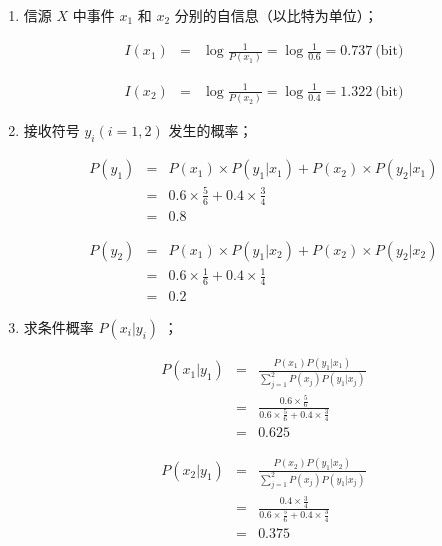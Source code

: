 \documentclass[onecolumn,oneside]{BUPTHomework}
\begin{document}
  \begin{solution}
  {
    \begin{enumerate}
      \item 信源 $X$ 中事件 $x_1$ 和 $x_2$ 分别的自信息（以比特为单位）；
      
      \begin{eqnarray} 
        I(x_1) &=& \log \frac{1}{P(x_1)} = \log \frac{1}{0.6} = 0.737\ \mbox{(bit)} \nonumber
      \end{eqnarray}
      
      \begin{eqnarray} 
        I(x_2) &=& \log \frac{1}{P(x_2)} = \log \frac{1}{0.4} = 1.322\ \mbox{(bit)} \nonumber
      \end{eqnarray}

      \item 接收符号 $y_i(i=1,2)$ 发生的概率；
      
      \begin{eqnarray} 
        P(y_1) &=& P(x_1) \times P(y_1 \vert x_1) + P(x_2) \times P(y_2 \vert x_1) \nonumber \\
        &=& 0.6 \times \frac{5}{6} + 0.4 \times \frac{3}{4} \nonumber \\
        &=& 0.8 \nonumber
      \end{eqnarray}

      \begin{eqnarray} 
        P(y_2) &=& P(x_1) \times P(y_1 \vert x_2) + P(x_2) \times P(y_2 \vert x_2) \nonumber \\
        &=& 0.6 \times \frac{1}{6} + 0.4 \times \frac{1}{4} \nonumber \\
        &=& 0.2 \nonumber 
      \end{eqnarray}

      \item 求条件概率 $P(x_i \vert y_i)$ ；
      
      \begin{eqnarray} 
        P(x_1 \vert y_1) &=& \frac{P(x_1)P(y_1 \vert x_1)}{\sum_{j=1}^2P(x_j)P(y_1 \vert x_j)} \nonumber \\
        &=& \frac{0.6 \times \frac{5}{6}}{0.6 \times \frac{5}{6} + 0.4 \times \frac{3}{4}} \nonumber \\
        &=& 0.625 \nonumber
      \end{eqnarray}

      \begin{eqnarray} 
        P(x_2 \vert y_1) &=& \frac{P(x_2)P(y_1 \vert x_2)}{\sum_{j=1}^2P(x_j)P(y_1 \vert x_j)} \nonumber \\
        &=& \frac{0.4 \times \frac{3}{4}}{0.6 \times \frac{5}{6} + 0.4 \times \frac{3}{4}} \nonumber \\
        &=& 0.375 \nonumber
      \end{eqnarray}


\end{enumerate}}
\end{solution}
\end{document}
